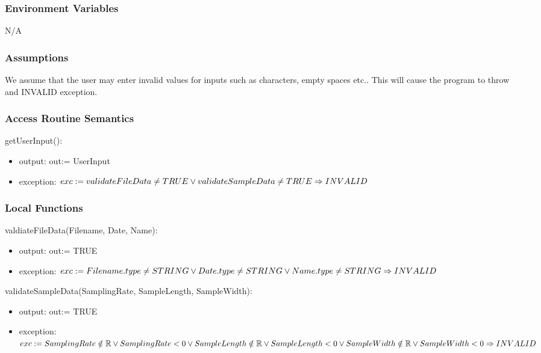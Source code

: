 \documentclass[12pt, titlepage]{article}
\begin{document}
\subsubsection{Environment Variables}

N/A

\subsubsection{Assumptions}
We assume that the user may enter invalid values for inputs such as characters, empty spaces etc..
This will cause the program to throw and INVALID exception.

\subsubsection{Access Routine Semantics}

\noindent getUserInput():
\begin{itemize}
\item output: out:= UserInput
\item exception: $exc:= 
validateFileData \ne TRUE  \lor\\
validateSampleData \ne TRUE \\
\Rightarrow INVALID$
\end{itemize}


\subsubsection{Local Functions}
\noindent valdiateFileData(Filename, Date, Name):
\begin{itemize}
\item output: out:= TRUE
\item exception: $exc:= 
Filename.type \ne STRING \lor \\
Date.type \ne STRING  \lor \\
Name.type \ne STRING  \\
\Rightarrow INVALID$
\end{itemize}

\noindent validateSampleData(SamplingRate, SampleLength, SampleWidth):
\begin{itemize}
\item output: out:= TRUE
\item exception: $exc:= 
SamplingRate \notin \mathbb{R} \lor SamplingRate < 0 \lor \\
SampleLength \notin \mathbb{R} \lor SampleLength < 0  \lor \\
SampleWidth \notin \mathbb{R} \lor SampleWidth < 0  \\
\Rightarrow INVALID$
\end{itemize}
\newpage
\end{document}
